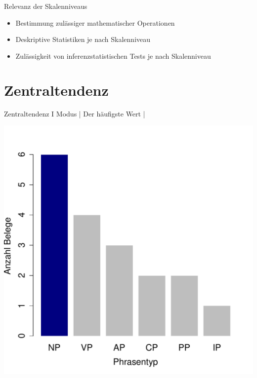 \begin{frame}
  {Relevanz der Skalenniveaus}
  \begin{itemize}[<+->]
    \item Bestimmung \alert{zulässiger mathematischer Operationen}
      \Halbzeile
    \item \alert{Deskriptive Statistiken} je nach Skalenniveau
      \Halbzeile
    \item Zulässigkeit von \alert{inferenzstatistischen Tests} je nach Skalenniveau
  \end{itemize}
\end{frame}


\section{Zentraltendenz}

\begin{frame}
  {Zentraltendenz I}
  \alert{Modus} | Der \alert{häufigste Wert} | \\
  \Zeile
  \begin{center}
    \includegraphics[height=0.6\textheight]{RVorlesung/mode}
  \end{center}
\end{frame}

